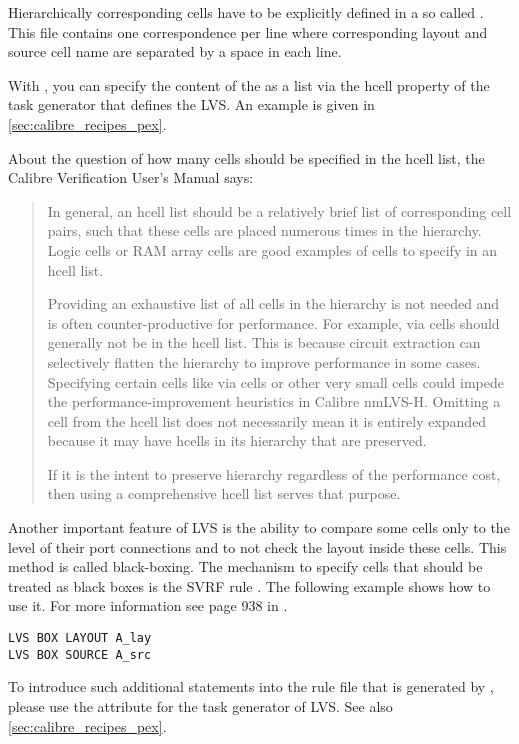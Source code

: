 Hierarchically corresponding cells have to be explicitly defined in a so called
. This file contains one correspondence per line where
corresponding layout and source cell name are separated by a space in each
line.

With , you can specify the content of the  as a
 list via the hcell property of the task generator that defines the
\gls{LVS}. An example is given in \cref{sec:calibre_recipes_pex}.

About the question of how many cells should be specified in the hcell list, the
Calibre Verification User's Manual \citep{calibre2014ver} says:
\begin{quote}
In general, an hcell list should be a relatively brief list of corresponding
cell pairs, such that these cells are placed numerous times in the hierarchy.
Logic cells or RAM array cells are good examples of cells to specify in an
hcell list.

Providing an exhaustive list of all cells in the hierarchy is not needed and is
often counter-productive for performance. For example, via cells should
generally not be in the hcell list. This is because circuit extraction can
selectively flatten the hierarchy to improve performance in some cases.
Specifying certain cells like via cells or other very small cells could impede
the performance-improvement heuristics in Calibre nmLVS-H. Omitting a cell from
the hcell list does not necessarily mean it is entirely expanded because it may
have hcells in its hierarchy that are preserved.

If it is the intent to preserve hierarchy regardless of the performance cost,
then using a comprehensive hcell list serves that purpose.
\end{quote}

Another important feature of  \gls{LVS} is the ability to compare
some cells only to the level of their port connections and to not check the
layout inside these cells. This method is called black-boxing. The mechanism to
specify cells that should be treated as black boxes is the \gls{SVRF} rule
. The following example shows how to use it. For more information
see page 938 in \citep{calibre2014svrf}.
\begin{verbatim}
LVS BOX LAYOUT A_lay
LVS BOX SOURCE A_src
\end{verbatim}

To introduce such additional statements into the rule file that is generated by
, please use the  attribute for the task generator of
\gls{LVS}. See also \cref{sec:calibre_recipes_pex}.

